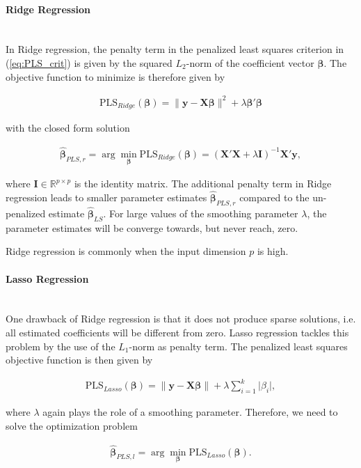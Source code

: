 \documentclass[10pt,a4paper]{article}
\newcommand{\subsubsubsection}[1]{\paragraph{#1}\mbox{}\\}
\begin{document}
\subsubsubsection{Ridge Regression}

In Ridge regression, the penalty term in the penalized least squares criterion in (\ref{eq:PLS_crit}) is given by the squared $L_2$-norm of the coefficient vector $\boldsymbol{\beta}$. The objective function to minimize is therefore given by

\begin{align}
	\text{PLS}_{Ridge}(\boldsymbol{\beta}) = \lVert \boldsymbol{y} - \boldsymbol{X} \boldsymbol{\beta} \rVert^2 + \lambda \boldsymbol{\beta}'\boldsymbol{\beta}
\end{align}

with the closed form solution 

\begin{align}
	\boldsymbol{\hat{\beta}}_{PLS,r} = \arg \min_{\boldsymbol{\beta}} \text{PLS}_{Ridge}(\boldsymbol{\beta}) = (\boldsymbol{X}'\boldsymbol{X} + \lambda \boldsymbol{I})^{-1}\boldsymbol{X}'\boldsymbol{y},
\end{align}

where $\boldsymbol{I} \in \mathbb R^{p \times p}$ is the identity matrix. The additional penalty term in Ridge regression leads to smaller parameter estimates $\boldsymbol{\hat{\beta}}_{PLS,r}$ compared to the un-penalized estimate $\boldsymbol{\hat{\beta}}_{LS}$. For large values of the smoothing parameter $\lambda$, the parameter estimates will be converge towards, but never reach, zero. 

Ridge regression is commonly when the input dimension $p$ is high. \cite{hoerl1970ridge}

\subsubsubsection{Lasso Regression}

One drawback of Ridge regression is that it does not produce sparse solutions, i.e. all estimated coefficients will be different from zero. Lasso regression tackles this problem by the use of the $L_1$-norm as penalty term. The penalized least squares objective function is then given by

\begin{align}
	\text{PLS}_{Lasso}(\boldsymbol{\beta}) = \lVert \boldsymbol{y} - \boldsymbol{X} \boldsymbol{\beta} \rVert + \lambda \sum_{i=1}^k\vert \beta_i \vert,
\end{align}

where $\lambda$ again plays the role of a smoothing parameter. Therefore, we need to solve the optimization problem

\begin{align} \label{eq:Lasso_OP}
	\boldsymbol{\hat{\beta}}_{PLS,l} = \arg \min_{\boldsymbol{\beta}} \text{PLS}_{Lasso}(\boldsymbol{\beta}).
\end{align}
\end{document}
